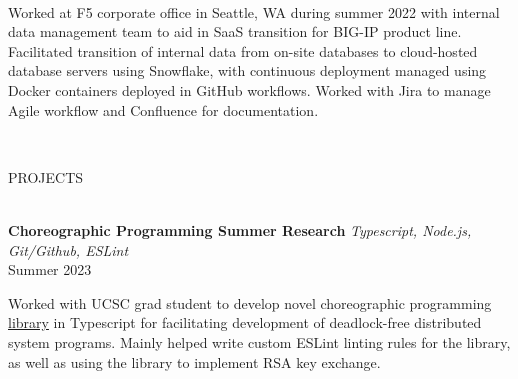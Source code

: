\documentclass[letterpaper,10pt]{article}
\begin{document}
\begin{multicols*}{2}
  \vspace{5px} \\
  \begin{minipage}{.5\textwidth}
    \begin{flushleft}
      Worked at F5 corporate office in Seattle, WA during summer 2022 with internal data management team to aid in SaaS transition for BIG-IP product line. Facilitated transition of internal data from on-site databases to cloud-hosted database servers using Snowflake, with continuous deployment managed using Docker containers deployed in GitHub workflows. Worked with Jira to manage Agile workflow and Confluence for documentation.
    \end{flushleft}
  \end{minipage}
  \vspace{1em} \\
  \begin{LARGE} \faTools\hspace{5px}PROJECTS \end{LARGE}
  \vspace{.5em} \\
  {
    \fontsize{10.5pt}{\baselineskip}\selectfont
    \textbf{Choreographic Programming Summer Research}
  }
  \textit{Typescript, Node.js, Git/Github, ESLint} \\
  Summer 2023
  \vspace{5px} \\
  \begin{minipage}{.5\textwidth}
    \begin{flushleft}
      Worked with UCSC grad student to develop novel choreographic programming \href{https://github.com/ImpregnableProgrammer/choreography-ts-RK-work}{library} in Typescript for facilitating development of deadlock-free distributed system programs. Mainly helped write custom ESLint linting rules for the library, as well as using the library to implement RSA key exchange.
    \end{flushleft}
  \end{minipage}

\end{multicols*}
\end{document}
